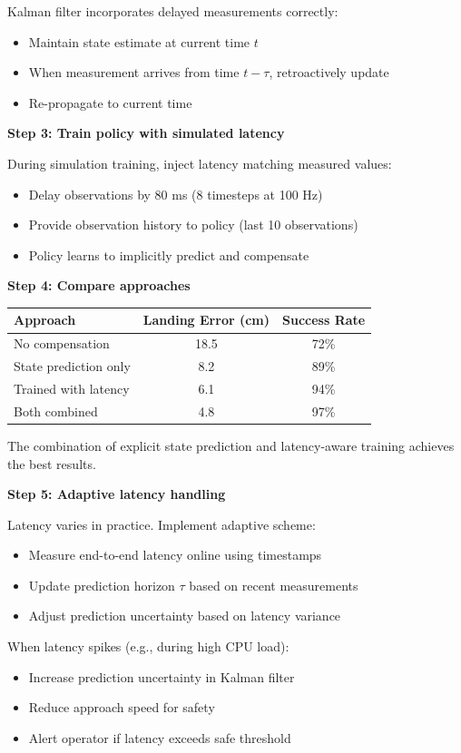 \begin{example}
Kalman filter incorporates delayed measurements correctly:
\begin{itemize}
    \item Maintain state estimate at current time $t$
    \item When measurement arrives from time $t - \tau$, retroactively update
    \item Re-propagate to current time
\end{itemize}

\textbf{Step 3: Train policy with simulated latency}

During simulation training, inject latency matching measured values:
\begin{itemize}
    \item Delay observations by 80 ms (8 timesteps at 100 Hz)
    \item Provide observation history to policy (last 10 observations)
    \item Policy learns to implicitly predict and compensate
\end{itemize}

\textbf{Step 4: Compare approaches}

\begin{center}
\begin{tabular}{lcc}
\toprule
\textbf{Approach} & \textbf{Landing Error (cm)} & \textbf{Success Rate} \\
\midrule
No compensation & 18.5 & 72\% \\
State prediction only & 8.2 & 89\% \\
Trained with latency & 6.1 & 94\% \\
Both combined & 4.8 & 97\% \\
\bottomrule
\end{tabular}
\end{center}

The combination of explicit state prediction and latency-aware training achieves the best results.

\textbf{Step 5: Adaptive latency handling}

Latency varies in practice. Implement adaptive scheme:
\begin{itemize}
    \item Measure end-to-end latency online using timestamps
    \item Update prediction horizon $\tau$ based on recent measurements
    \item Adjust prediction uncertainty based on latency variance
\end{itemize}

When latency spikes (e.g., during high CPU load):
\begin{itemize}
    \item Increase prediction uncertainty in Kalman filter
    \item Reduce approach speed for safety
    \item Alert operator if latency exceeds safe threshold
\end{itemize}
\end{example}

